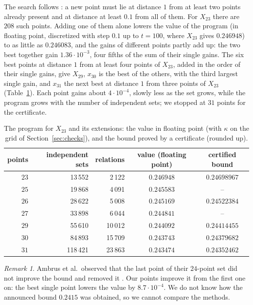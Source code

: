 \documentclass[11pt,a4paper]{amsart}
\theoremstyle{remark}
\newtheorem*{remark}{Remark}
\newcommand{\NPTS}{31}
\begin{document}
The search follows \cite[§7]{ACMVZ}: a new point must lie at distance $1$ from at least two points already present and at
distance at least $0.1$ from all of them. For $X_{23}$ there are $208$ such points. Adding one of them alone lowers the
value of the program (in floating point, discretized with step $0.1$ up to $t=100$, where $X_{23}$ gives $0.246948$) to as
little as $0.246083$, and the gains of different points partly add up: the two best together gain $1.36\cdot10^{-3}$,
four fifths of the sum of their single gains. The six best points at distance $1$ from at least four points of
$X_{23}$, added in the order of their single gains, give $X_{29}$, $x_{30}$ is the best of the others, with the third
largest single gain, and $x_{31}$ the next best at distance $1$ from three points of $X_{23}$ (Table~\ref{tab:values}). Each point gains about $4\cdot10^{-4}$, slowly less as the set grows, while the program grows with
the number of independent sets; we stopped at $\NPTS$ points for the certificate.

\begin{table}[ht]
\centering
\begin{tabular}{rrrcc}
\toprule
points & independent sets & relations & value (floating point) & certified bound\\
\midrule
$23$ & 13\,552 & 2\,122 & $0.246948$ & $0.24698967$ \\
$25$ & 19\,868 & 4\,091 & $0.245583$ & -- \\
$26$ & 28\,622 & 5\,008 & $0.245169$ & $0.24522384$ \\
$27$ & 33\,898 & 6\,044 & $0.244841$ & -- \\
$29$ & 55\,610 & 10\,012 & $0.244092$ & $0.24414455$ \\
$30$ & 84\,893 & 15\,709 & $0.243743$ & $0.24379682$ \\
$31$ & 118\,421 & 23\,863 & $0.243474$ & $0.24352462$ \\
\bottomrule
\end{tabular}
\caption{The program for $X_{23}$ and its extensions: the value in floating point (with $\kappa$ on the grid of Section~\ref{sec:checks}), and the bound proved by a certificate (rounded up).}\label{tab:values}
\end{table}

\begin{remark}
Ambrus et al.\ observed that the last point of their $24$-point set did not improve the bound and removed it
\cite[§9]{ACMVZ}. Our points improve it from the first one on: the best single point lowers the value by $8.7\cdot10^{-4}$.
We do not know how the announced bound $0.2415$ \cite{Varga} was obtained, so we cannot compare the methods.
\end{remark}
\end{document}
